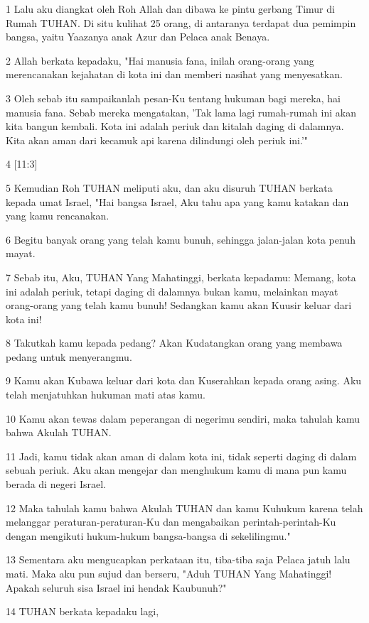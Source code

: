 \par 1 Lalu aku diangkat oleh Roh Allah dan dibawa ke pintu gerbang Timur di Rumah TUHAN. Di situ kulihat 25 orang, di antaranya terdapat dua pemimpin bangsa, yaitu Yaazanya anak Azur dan Pelaca anak Benaya.
\par 2 Allah berkata kepadaku, "Hai manusia fana, inilah orang-orang yang merencanakan kejahatan di kota ini dan memberi nasihat yang menyesatkan.
\par 3 Oleh sebab itu sampaikanlah pesan-Ku tentang hukuman bagi mereka, hai manusia fana. Sebab mereka mengatakan, 'Tak lama lagi rumah-rumah ini akan kita bangun kembali. Kota ini adalah periuk dan kitalah daging di dalamnya. Kita akan aman dari kecamuk api karena dilindungi oleh periuk ini.'"
\par 4 [11:3]
\par 5 Kemudian Roh TUHAN meliputi aku, dan aku disuruh TUHAN berkata kepada umat Israel, "Hai bangsa Israel, Aku tahu apa yang kamu katakan dan yang kamu rencanakan.
\par 6 Begitu banyak orang yang telah kamu bunuh, sehingga jalan-jalan kota penuh mayat.
\par 7 Sebab itu, Aku, TUHAN Yang Mahatinggi, berkata kepadamu: Memang, kota ini adalah periuk, tetapi daging di dalamnya bukan kamu, melainkan mayat orang-orang yang telah kamu bunuh! Sedangkan kamu akan Kuusir keluar dari kota ini!
\par 8 Takutkah kamu kepada pedang? Akan Kudatangkan orang yang membawa pedang untuk menyerangmu.
\par 9 Kamu akan Kubawa keluar dari kota dan Kuserahkan kepada orang asing. Aku telah menjatuhkan hukuman mati atas kamu.
\par 10 Kamu akan tewas dalam peperangan di negerimu sendiri, maka tahulah kamu bahwa Akulah TUHAN.
\par 11 Jadi, kamu tidak akan aman di dalam kota ini, tidak seperti daging di dalam sebuah periuk. Aku akan mengejar dan menghukum kamu di mana pun kamu berada di negeri Israel.
\par 12 Maka tahulah kamu bahwa Akulah TUHAN dan kamu Kuhukum karena telah melanggar peraturan-peraturan-Ku dan mengabaikan perintah-perintah-Ku dengan mengikuti hukum-hukum bangsa-bangsa di sekelilingmu."
\par 13 Sementara aku mengucapkan perkataan itu, tiba-tiba saja Pelaca jatuh lalu mati. Maka aku pun sujud dan berseru, "Aduh TUHAN Yang Mahatinggi! Apakah seluruh sisa Israel ini hendak Kaubunuh?"
\par 14 TUHAN berkata kepadaku lagi,
